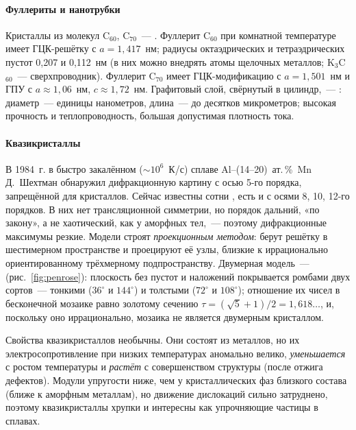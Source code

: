 \paragraph{Фуллериты и нанотрубки}
Кристаллы из молекул C$_{60}$, C$_{70}$~— . Фуллерит C$_{60}$ при
комнатной температуре имеет ГЦК-решётку с $a=1{,}417$~нм; радиусы
октаэдрических и тетраэдрических пустот 0,207 и 0,112~нм (в них можно
внедрять атомы щелочных металлов; K$_3$C$_{60}$~— сверхпроводник). Фуллерит
C$_{70}$ имеет ГЦК-модификацию с $a=1{,}501$~нм и ГПУ с $a\approx1{,}06$~нм,
$c\approx1{,}72$~нм. Графитовый слой, свёрнутый в цилиндр,~—
: диаметр~— единицы нанометров, длина~— до
десятков микрометров; высокая прочность и теплопроводность, большая
допустимая плотность тока.

\paragraph{Квазикристаллы}
В 1984~г. в быстро закалённом (${\sim}10^6$~К/с) сплаве Al--(14--20)~ат.\,\%~Mn
Д.~Шехтман обнаружил дифракционную картину с осью 5-го порядка,
запрещённой для кристаллов. Сейчас известны сотни ,
есть и с осями 8, 10, 12-го порядков. В них нет трансляционной
симметрии, но порядок дальний, «по закону», а не хаотический, как у
аморфных тел,~— поэтому дифракционные максимумы резкие. Модели строят
\emph{проекционным методом}: берут решётку в шестимерном пространстве и
проецируют её узлы, близкие к иррационально ориентированному трёхмерному
подпространству. Двумерная модель~— 
(рис.~\ref{fig:penrose}): плоскость без пустот и наложений покрывается
ромбами двух сортов~— тонкими ($36^\circ$ и $144^\circ$) и толстыми ($72^\circ$ и
$108^\circ$); отношение их чисел в бесконечной мозаике равно золотому сечению
$\tau=(\sqrt5+1)/2=1{,}618\ldots$, и, поскольку оно иррационально, мозаика не
является двумерным кристаллом.

Свойства квазикристаллов необычны. Они состоят из металлов, но их
электросопротивление при низких температурах аномально велико,
\emph{уменьшается} с ростом температуры и \emph{растёт} с совершенством
структуры (после отжига дефектов). Модули упругости ниже, чем у
кристаллических фаз близкого состава (ближе к аморфным металлам), но
движение дислокаций сильно затруднено, поэтому квазикристаллы хрупки и
интересны как упрочняющие частицы в сплавах.

